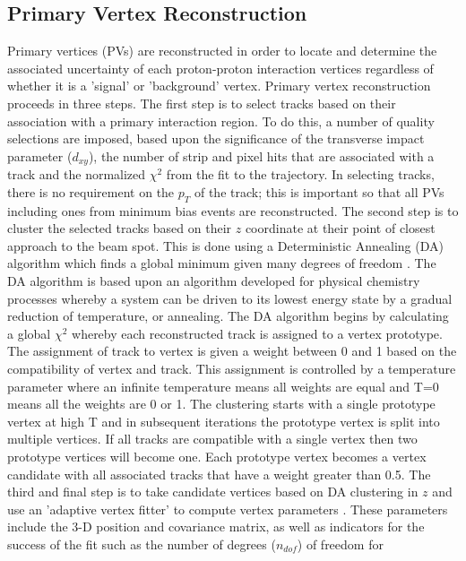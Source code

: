 \subsection{Primary Vertex Reconstruction}
Primary vertices (PVs) are reconstructed in order to 
locate and determine the associated uncertainty of each 
proton-proton interaction vertices regardless of whether it is a 'signal' or 'background' vertex. 
Primary vertex reconstruction proceeds in three steps. 
The first step is to select tracks based on their association with a primary interaction region. 
To do this, a number of quality selections are imposed, based upon the significance of the 
transverse impact parameter ($d_{xy}$), the number of strip and pixel hits that are 
associated with a track and the normalized $\chi^{2}$ from the fit to the 
trajectory. In selecting tracks, there is no requirement on the $p_{T}$ of the track; 
this is important so that all PVs including ones from minimum bias events are reconstructed. 
The second step is to cluster the selected tracks based on their $z$ coordinate at their 
point of closest approach to the beam spot. This is done using a Deterministic Annealing (DA) 
algorithm which finds a global minimum given many degrees of freedom \cite{DAAnnealing}. 
The DA algorithm is based upon %
an algorithm developed for physical chemistry processes whereby 
a system can be driven to its lowest energy state by a gradual reduction 
of temperature, or annealing. The DA algorithm begins by 
calculating a global $\chi^{2}$ whereby each reconstructed 
track is assigned to a vertex prototype. The assignment of track to vertex is given 
a weight between 0 and 1 based on the compatibility of vertex and track. This assignment 
is controlled by a temperature parameter where an infinite temperature means 
all weights are equal and T=0 means all the weights are 0 or 1. The clustering 
starts with a single prototype vertex at high T and in subsequent iterations 
the prototype vertex is split into multiple vertices. If all tracks are compatible with 
a single vertex then two prototype vertices will become one. Each 
prototype vertex becomes a vertex candidate with all 
associated tracks that have a weight greater than 0.5. 
The third and final step is to take candidate vertices based on DA clustering in $z$ and use
an 'adaptive vertex fitter'  
to compute vertex parameters \cite{KalmanFilter}. These parameters include the 3-D position and  covariance matrix, 
as well as indicators for the success of the fit such as the number of degrees ($n_{dof}$) of freedom for 
